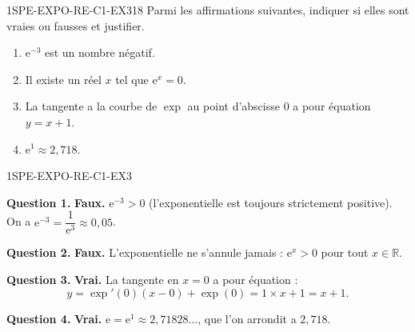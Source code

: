
\begin{exercice}{1SPE-EXPO-RE-C1-EX3}{1}{8}
Parmi les affirmations suivantes, indiquer si elles sont vraies ou fausses et justifier.
\begin{enumerate}
  \item $\mathrm{e}^{-3}$ est un nombre négatif.
  \item Il existe un réel $x$ tel que $\mathrm{e}^x = 0$.
  \item La tangente a la courbe de $\exp$ au point d'abscisse $0$ a pour équation $y = x + 1$.
  \item $\mathrm{e}^1 \approx 2{,}718$.
\end{enumerate}
\end{exercice}


\begin{corrige}{1SPE-EXPO-RE-C1-EX3}

\textbf{Question 1.} \textbf{Faux.} $\mathrm{e}^{-3} > 0$ (l'exponentielle est toujours strictement positive). On a $\mathrm{e}^{-3} = \dfrac{1}{\mathrm{e}^3} \approx 0{,}05$.

\textbf{Question 2.} \textbf{Faux.} L'exponentielle ne s'annule jamais : $\mathrm{e}^x > 0$ pour tout $x \in \mathbb{R}$.


\textbf{Question 3.} \textbf{Vrai.} La tangente en $x = 0$ a pour équation :
\[
y = \exp'(0)(x - 0) + \exp(0) = 1 \times x + 1 = x + 1.
\]

\textbf{Question 4.} \textbf{Vrai.} $\mathrm{e} = \mathrm{e}^1 \approx 2{,}71828...$, que l'on arrondit a $2{,}718$.

\end{corrige}
